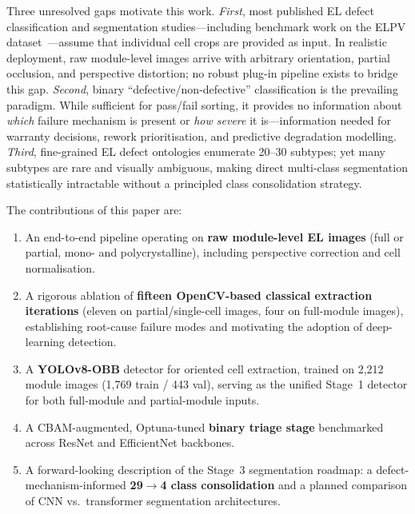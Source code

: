 \documentclass[conference]{IEEEtran}
\begin{document}
Three unresolved gaps motivate this work.
\textit{First}, most published EL defect classification and
segmentation studies---including benchmark work on the ELPV
dataset~\cite{deitsch2019}---assume that individual cell crops
are provided as input.
In realistic deployment, raw module-level images arrive with
arbitrary orientation, partial occlusion, and perspective
distortion; no robust plug-in pipeline exists to bridge this gap.
\textit{Second}, binary ``defective/non-defective''
classification is the prevailing paradigm.
While sufficient for pass/fail sorting, it provides no
information about \textit{which} failure mechanism is present
or \textit{how severe} it is---information needed for
warranty decisions, rework prioritisation, and predictive
degradation modelling.
\textit{Third}, fine-grained EL defect ontologies enumerate
20--30 subtypes; yet many subtypes are rare and visually
ambiguous, making direct multi-class segmentation
statistically intractable without a principled class
consolidation strategy.

The contributions of this paper are:
\begin{enumerate}
  \item An end-to-end pipeline operating on \textbf{raw
        module-level EL images} (full or partial, mono- and
        polycrystalline), including perspective correction and
        cell normalisation.
  \item A rigorous ablation of \textbf{fifteen
        OpenCV-based classical extraction iterations} (eleven
        on partial/single-cell images, four on full-module
        images), establishing root-cause failure modes and
        motivating the adoption of deep-learning detection.
  \item A \textbf{YOLOv8-OBB} detector for oriented cell
        extraction, trained on 2{,}212 module images
        (1{,}769 train / 443 val), serving as the unified
        Stage~1 detector for both full-module and
        partial-module inputs.
  \item A CBAM-augmented, Optuna-tuned \textbf{binary triage
        stage} benchmarked across ResNet and EfficientNet
        backbones.
  \item A forward-looking description of the Stage~3
        segmentation roadmap: a defect-mechanism-informed
        \textbf{29$\to$4 class consolidation} and a planned
        comparison of CNN vs.\ transformer segmentation
        architectures.
\end{enumerate}

\end{document}
